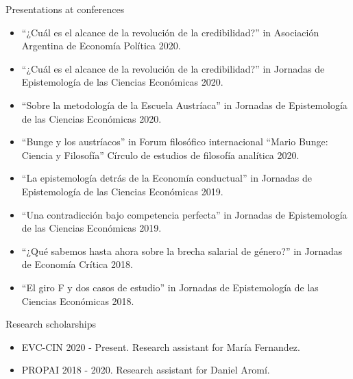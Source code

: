 \documentclass{resume} %
\begin{document}
\begin{rSection}{Presentations at conferences}
\begin{itemize}
  \item “¿Cuál es el alcance de la revolución de la credibilidad?” in Asociación Argentina de Economía Política 2020.
  \item “¿Cuál es el alcance de la revolución de la credibilidad?” in Jornadas de Epistemología de las Ciencias Económicas 2020.
 \item “Sobre la metodología de la Escuela Austríaca” in Jornadas de Epistemología de las Ciencias Económicas 2020.
  \item “Bunge y los austríacos” in Forum filosófico internacional “Mario Bunge: Ciencia y Filosofía” Círculo de estudios de filosofía analítica 2020.
  \item “La epistemología detrás de la Economía conductual” in Jornadas de Epistemología de las Ciencias Económicas 2019.
  \item “Una contradicción bajo competencia perfecta” in Jornadas de Epistemología de las Ciencias Económicas 2019.
  \item “¿Qué sabemos hasta ahora sobre la brecha salarial de género?” in Jornadas de Economía Crítica 2018.
  \item “El giro F y dos casos de estudio” in Jornadas de Epistemología de las Ciencias Económicas 2018.

\end{itemize}

\end{rSection}
\begin{rSection}{Research scholarships}
\begin{itemize}
\item EVC-CIN 2020 - Present. Research assistant for María Fernandez.
\item PROPAI 2018 - 2020. Research assistant for Daniel Aromí.
\end{itemize}
\end{rSection}
\end{document}
